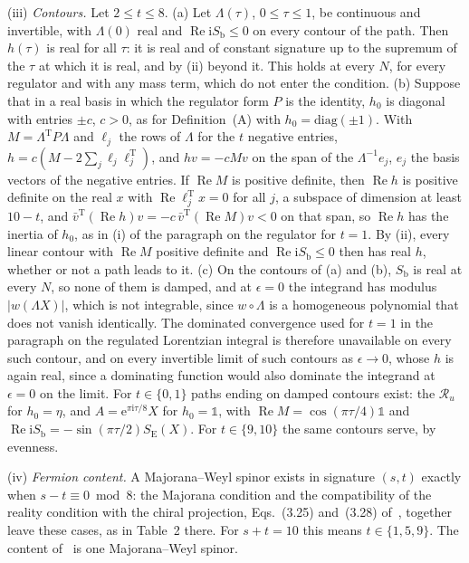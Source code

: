 (iii) \emph{Contours.} Let \(2\le t\le8\). (a) Let \(\Lambda(\tau)\), \(0\le\tau\le1\), be continuous and invertible, with \(\Lambda(0)\) real and \(\operatorname{Re}\mathrm iS_{\mathrm b}\le0\) on every contour of the path. Then \(h(\tau)\) is real for all \(\tau\): it is real and of constant signature up to the supremum of the \(\tau\) at which it is real, and by (ii) beyond it. This holds at every \(N\), for every regulator and with any mass term, which do not enter the condition. (b) Suppose that in a real basis in which the regulator form \(P\) is the identity, \(h_0\) is diagonal with entries \(\pm c\), \(c>0\), as for Definition~(A) with \(h_0=\mathrm{diag}(\pm1)\). With \(M=\Lambda^{\mathrm T}P\Lambda\) and \(\ell_j\) the rows of \(\Lambda\) for the \(t\) negative entries, \(h=c(M-2\sum_j\ell_j\ell_j^{\mathrm T})\), and \(hv=-cMv\) on the span of the \(\Lambda^{-1}e_j\), \(e_j\) the basis vectors of the negative entries. If \(\operatorname{Re}M\) is positive definite, then \(\operatorname{Re}h\) is positive definite on the real \(x\) with \(\operatorname{Re}\ell_j^{\mathrm T}x=0\) for all \(j\), a subspace of dimension at least \(10-t\), and \(\bar v^{\mathrm T}(\operatorname{Re}h)v=-c\,\bar v^{\mathrm T}(\operatorname{Re}M)v<0\) on that span, so \(\operatorname{Re}h\) has the inertia of \(h_0\), as in (i) of the paragraph on the regulator for \(t=1\). By (ii), every linear contour with \(\operatorname{Re}M\) positive definite and \(\operatorname{Re}\mathrm iS_{\mathrm b}\le0\) then has real \(h\), whether or not a path leads to it. (c) On the contours of (a) and (b), \(S_{\mathrm b}\) is real at every \(N\), so none of them is damped, and at \(\epsilon=0\) the integrand has modulus \(|w(\Lambda X)|\), which is not integrable, since \(w\circ\Lambda\) is a homogeneous polynomial that does not vanish identically. The dominated convergence used for \(t=1\) in the paragraph on the regulated Lorentzian integral is therefore unavailable on every such contour, and on every invertible limit of such contours as \(\epsilon\to0\), whose \(h\) is again real, since a dominating function would also dominate the integrand at \(\epsilon=0\) on the limit. For \(t\in\{0,1\}\) paths ending on damped contours exist: the \(\mathcal R_u\) for \(h_0=\eta\), and \(A=\mathrm e^{\pi\mathrm i\tau/8}X\) for \(h_0=\mathbb 1\), with \(\operatorname{Re}M=\cos(\pi\tau/4)\mathbb 1\) and \(\operatorname{Re}\mathrm iS_{\mathrm b}=-\sin(\pi\tau/2)S_{\mathrm E}(X)\). For \(t\in\{9,10\}\) the same contours serve, by evenness.

(iv) \emph{Fermion content.} A Majorana--Weyl spinor exists in signature \((s,t)\) exactly when \(s-t\equiv0\bmod8\): the Majorana condition and the compatibility of the reality condition with the chiral projection, Eqs.~(3.25) and~(3.28) of~\cite{VanProeyen1999}, together leave these cases, as in Table~2 there. For \(s+t=10\) this means \(t\in\{1,5,9\}\). The content of~\cite{IKKT1997} is one Majorana--Weyl spinor.

